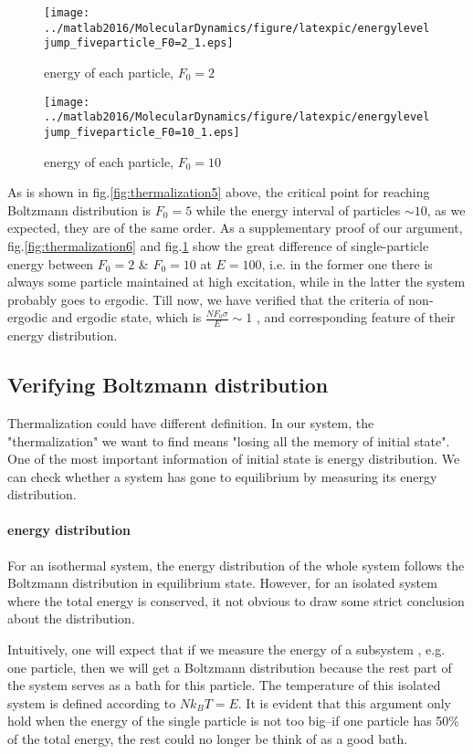 \documentclass[a4paper,onecolumn,12pt]{article}
\begin{document}
\begin{figure}
\centering
\texttt{[image: ../matlab2016/MolecularDynamics/figure/latexpic/energyleveljump\_fiveparticle\_F0=2\_1.eps]}
\caption{energy of each particle, $F_0=2$}
\label{fig:thermalization6}

\centering
\texttt{[image: ../matlab2016/MolecularDynamics/figure/latexpic/energyleveljump\_fiveparticle\_F0=10\_1.eps]}
\caption{energy of each particle, $F_0=10$}
\label{fig:thermalization7}
\end{figure}

As is shown in fig.\ref{fig:thermalization5} above, the critical point for reaching Boltzmann distribution is $F_0=5$ while the energy interval of particles $\sim 10$, as we expected, they are of the same order. As a supplementary proof of our argument, fig.\ref{fig:thermalization6} and fig.\ref{fig:thermalization7} show the great difference of single-particle energy between $F_0=2$ $\&$ $F_0=10$ at $E=100$, i.e. in the former one there is always some particle maintained at high excitation, while in the latter the system probably goes to ergodic. Till now, we have verified that the criteria of non-ergodic and ergodic state, which is $\frac{NF_0\sigma}{E}\sim1 $ , and corresponding feature of their energy distribution.
 



\newpage
\subsection{Verifying Boltzmann distribution}
Thermalization could have different definition. In our system, the "thermalization" we want to find means "losing all the memory of initial state". One of the most important information of initial state is energy distribution. We can check whether a system has gone to equilibrium by measuring its energy distribution.

 
\paragraph{energy distribution}
For an isothermal system, the energy distribution of the whole system follows the Boltzmann distribution in equilibrium state. However, for an isolated system where the total energy is conserved, it not obvious to draw some strict conclusion about the distribution.
 
Intuitively, one will expect that if we measure the energy of a subsystem , e.g. one particle, then we will get a Boltzmann distribution because the rest part of the system serves as a bath for this particle. The temperature of this isolated system is defined according to $Nk_BT=E$. It is evident that this argument only hold when the energy of the single particle is not too big--if one particle has 50\% of the total energy, the rest could no longer be think of as a good bath.
\end{document}
